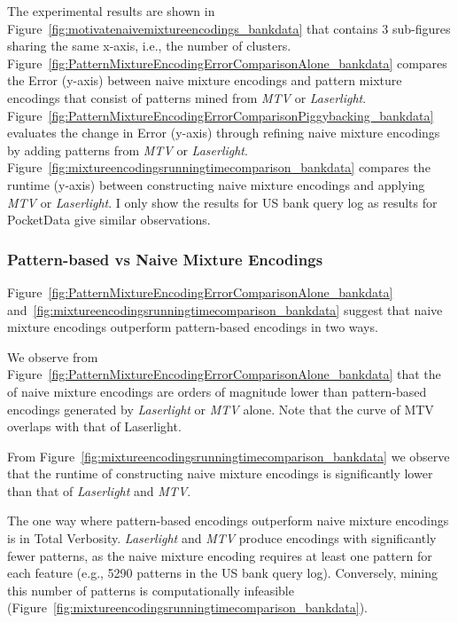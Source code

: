 The experimental results are shown in Figure~\ref{fig:motivatenaivemixtureencodings_bankdata} that contains 3 sub-figures sharing the same x-axis, i.e., the number of clusters.
Figure~\ref{fig:PatternMixtureEncodingErrorComparisonAlone_bankdata} compares the Error (y-axis) between naive mixture encodings and pattern mixture encodings that consist of patterns mined from \textit{MTV} or \textit{Laserlight}.
Figure~\ref{fig:PatternMixtureEncodingErrorComparisonPiggybacking_bankdata} evaluates the change in Error (y-axis) through refining naive mixture encodings by adding patterns from \textit{MTV} or \textit{Laserlight}.
Figure~\ref{fig:mixtureencodingsrunningtimecomparison_bankdata} compares the runtime (y-axis) between constructing naive mixture encodings and applying \textit{MTV} or \textit{Laserlight}.
I only show the results for US bank query log as results for PocketData give similar observations. 

\subsubsection{Pattern-based vs Naive Mixture Encodings}
\label{sec:Replacing_Naive_Mixture_Encodings}
Figure~\ref{fig:PatternMixtureEncodingErrorComparisonAlone_bankdata} and~\ref{fig:mixtureencodingsrunningtimecomparison_bankdata} suggest that naive mixture encodings outperform pattern-based encodings in two ways.

\tinysection{\errorname}
We observe from Figure~\ref{fig:PatternMixtureEncodingErrorComparisonAlone_bankdata} that the \errorname of naive mixture encodings are orders of magnitude lower than pattern-based encodings generated by \textit{Laserlight} or \textit{MTV} alone.
Note that the curve of MTV overlaps with that of Laserlight.

From Figure~\ref{fig:mixtureencodingsrunningtimecomparison_bankdata} we observe that the runtime of constructing naive mixture encodings is significantly lower than that of \textit{Laserlight} and \textit{MTV}.

The one way where pattern-based encodings outperform naive mixture encodings is in Total Verbosity. 
\textit{Laserlight} and \textit{MTV} produce encodings with significantly fewer patterns, as the naive mixture encoding requires at least one pattern for each feature (e.g., 5290 patterns in the US bank query log).
Conversely, mining this number of patterns is computationally infeasible (Figure~\ref{fig:mixtureencodingsrunningtimecomparison_bankdata}).

